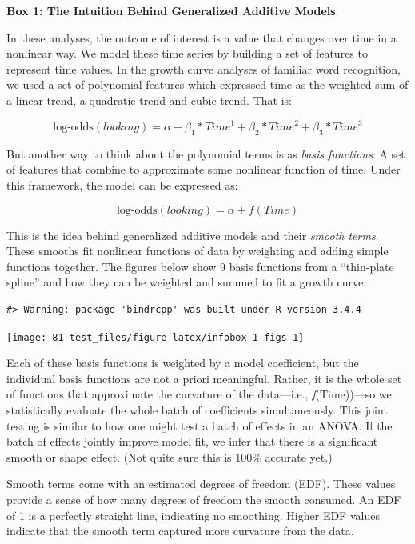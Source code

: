 \documentclass [11pt, proquest] {uwthesis}[2015/03/03]
\begin{document}
\textbf{Box 1: The Intuition Behind Generalized Additive Models}.

In these analyses, the outcome of interest is a value that changes over
time in a nonlinear way. We model these time series by building a set of
features to represent time values. In the growth curve analyses of
familiar word recognition, we used a set of polynomial features which
expressed time as the weighted sum of a linear trend, a quadratic trend
and cubic trend. That is:

\[
\text{log-odds}(\mathit{looking}) = 
  \alpha + \beta_1 * \textit{Time}^1 +
           \beta_2 * \textit{Time}^2 +
           \beta_3 * \textit{Time}^3
\]

But another way to think about the polynomial terms is as \emph{basis
functions}: A set of features that combine to approximate some nonlinear
function of time. Under this framework, the model can be expressed as:

\[
\text{log-odds}(\mathit{looking}) = 
  \alpha + f(\textit{Time})
\]

This is the idea behind generalized additive models and their
\emph{smooth terms}. These smooths fit nonlinear functions of data by
weighting and adding simple functions together. The figures below show 9
basis functions from a ``thin-plate spline'' and how they can be
weighted and summed to fit a growth curve.
\begin{verbatim}
#> Warning: package 'bindrcpp' was built under R version 3.4.4
\end{verbatim}
\begin{center}\texttt{[image: 81-test\_files/figure-latex/infobox-1-figs-1]} \end{center}

Each of these basis functions is weighted by a model coefficient, but
the individual basis functions are not a priori meaningful. Rather, it
is the whole set of functions that approximate the curvature of the
data---i.e., \emph{f}(Time))---so we statistically evaluate the whole
batch of coefficients simultaneously. This joint testing is similar to
how one might test a batch of effects in an ANOVA. If the batch of
effects jointly improve model fit, we infer that there is a significant
smooth or shape effect. (Not quite sure this is 100\% accurate yet.)

Smooth terms come with an estimated degrees of freedom (EDF). These
values provide a sense of how many degrees of freedom the smooth
consumed. An EDF of 1 is a perfectly straight line, indicating no
smoothing. Higher EDF values indicate that the smooth term captured more
curvature from the data.
\end{document}
